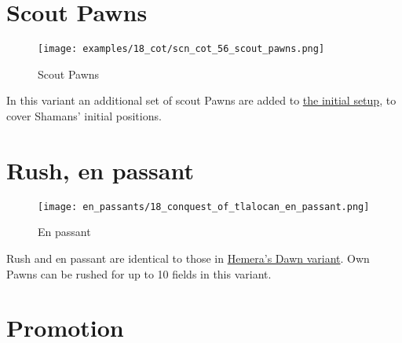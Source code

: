 \clearpage %

\section*{Scout Pawns}
\label{sec:Conquest of Tlalocan/Scout Pawns}

\vspace*{-1.2\baselineskip}
\noindent
\begin{figure}[!h]
\texttt{[image: examples/18\_cot/scn\_cot\_56\_scout\_pawns.png]}
\caption{Scout Pawns}
\label{fig:scn_cot_56_scout_pawns}
\end{figure}

In this variant an additional set of scout Pawns are added to
\hyperref[fig:18_conquest_of_tlalocan]{the initial setup},
to cover Shamans' initial positions.

\clearpage %

\section*{Rush, en passant}
\label{sec:Conquest of Tlalocan/Rush, en passant}

\vspace*{-1.2\baselineskip}
\noindent
\begin{figure}[!h]
\texttt{[image: en\_passants/18\_conquest\_of\_tlalocan\_en\_passant.png]}
\caption{En passant}
\label{fig:18_conquest_of_tlalocan_en_passant}
\end{figure}

Rush and en passant are identical to those in
\hyperref[fig:14_hemera_s_dawn_en_passant]{Hemera's Dawn variant}.
Own Pawns can be rushed for up to 10 fields in this variant.

\clearpage %

\section*{Promotion}
\label{sec:Conquest of Tlalocan/Promotion}


